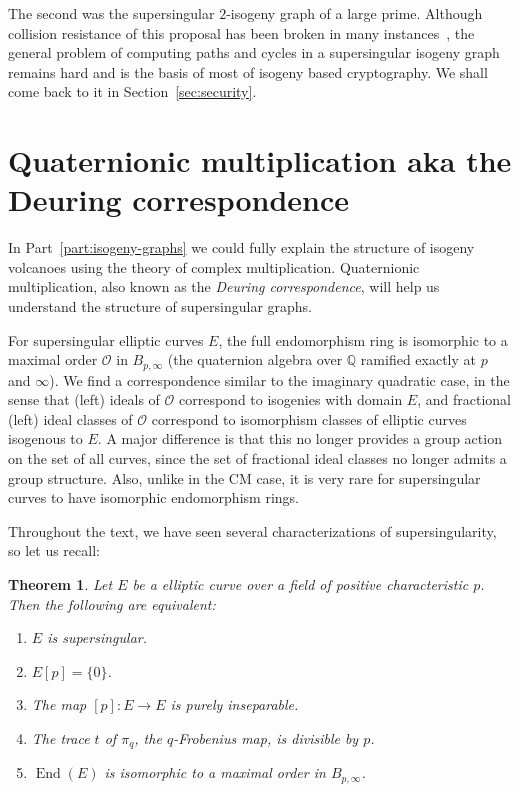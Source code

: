 \documentclass[10pt]{article}
\theoremstyle{plain}
\newtheorem{theorem}{Theorem}
\theoremstyle{definition}
\DeclareMathOperator{\End}{End} %
\def\Q{\ensuremath{\mathbb{Q}}}
\def\O{\ensuremath{\mathcal{O}}}
\begin{document}
The second was the supersingular $2$-isogeny graph of a large prime. %
Although collision resistance of this proposal has been broken in many
instances~\cite{EC:EHLMP18}, the general problem of computing paths
and cycles in a supersingular isogeny graph remains hard and is the
basis of most of isogeny based cryptography. %
We shall come back to it in Section~\ref{sec:security}.



\section{Quaternionic multiplication aka the Deuring correspondence}
\label{sec:quat-mult-aka}

In Part~\ref{part:isogeny-graphs} we could fully explain the structure
of isogeny volcanoes using the theory of complex multiplication. %
Quaternionic multiplication, also known as the \emph{Deuring
  correspondence}, will help us understand the structure of
supersingular graphs. %

For supersingular elliptic curves $E$, the full endomorphism ring is
isomorphic to a maximal order $\O$ in $B_{p,\infty}$ (the quaternion
algebra over $\Q$ ramified exactly at $p$ and $\infty$). %
We find a correspondence similar to the imaginary quadratic case,
in the sense that (left) ideals of $\O$ correspond to isogenies
with domain $E$, and fractional (left) ideal classes of $\O$
correspond to isomorphism classes of elliptic curves isogenous to $E$.
A major difference is that this no longer provides a group action
on the set of all curves, since the set of fractional ideal classes
no longer admits a group structure.
Also, unlike in the CM case, it is very rare for supersingular
curves to have isomorphic endomorphism rings.

Throughout the text, we have seen several characterizations
of supersingularity, so let us recall:

\begin{theorem}
Let $E$ be a elliptic curve over a field of positive characteristic $p$.
Then the following are equivalent:
\begin{enumerate}
    \item $E$ is supersingular.
    \item $E[p] = \{0\}$.
    \item The map $[p]:E\to E$ is purely inseparable.
    \item The trace $t$ of $\pi_q$, the $q$-Frobenius map,
    is divisible by $p$.
    \item $\End(E)$ is isomorphic to a maximal order in $B_{p,\infty}$.
\end{enumerate}
\end{theorem}
\end{document}
